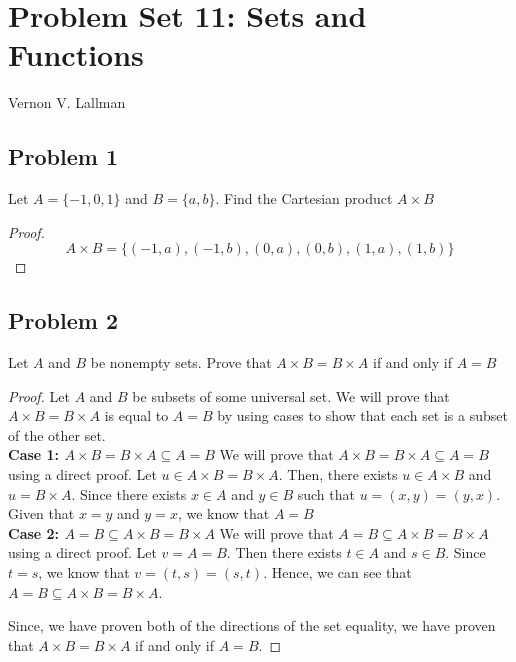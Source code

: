 \newpage
\section{Problem Set 11: Sets and Functions} 
    \begin{center}
        Vernon V. Lallman
    \end{center}

\subsection{Problem 1}
    \begin{tcolorbox}
        Let $A = \{ -1, 0, 1 \}$ and $B = \{a,b \}$. Find the Cartesian product $A \times B$
    \end{tcolorbox}

    \begin{proof}
        \begin{equation*}
            A \times B = \{ (-1,a), (-1,b), (0,a), (0,b), (1,a), (1,b) \}
        \end{equation*}
    \end{proof}

\subsection{Problem 2}
    \begin{tcolorbox}
        Let $A$ and $B$ be nonempty sets. Prove that $A \times B = B \times A$ if and only if $A=B$
    \end{tcolorbox}

    \begin{proof}
        Let $A$ and $B$ be subsets of some universal set. We will prove that $A \times B = B \times A$ is equal to $A=B$ by using cases to show that each set is a subset of the other set. \\
        
        \textbf{Case 1: $A \times B = B \times A \subseteq A=B$}
            We will prove that $A \times B = B \times A \subseteq A=B$ using a direct proof. Let $u \in A \times B = B \times A$. Then, there exists $u \in A \times B$ and $u = B \times A$. Since there exists $x \in A$ and $y \in B$ such that $u = (x,y) = (y,x)$. Given that $x=y$ and $y=x$, we know that $A=B$ \\
        
        \textbf{Case 2: $A=B \subseteq A \times B = B \times A$}
            We will prove that $A=B \subseteq A \times B = B \times A$ using a direct proof. Let $v = A=B$. Then there exists $t \in A$ and $s \in B$. Since $t=s$, we know that $v = (t,s)=(s,t)$. Hence, we can see that $A=B \subseteq A \times B = B \times A$. 
        
        Since, we have proven both of the directions of the set equality, we have proven that $A \times B = B \times A$ if and only if $A=B$. 
    \end{proof}

